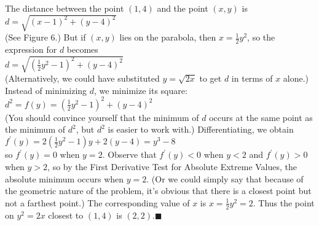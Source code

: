 \documentclass{sebase}
\begin{document}
\begin{Solution}
The distance between the point $(1,4)$ and the point $(x,y)$ is\\[6pt]
\hspace*{\fill}$d=\sqrt{(x-1)^{2}+(y-4)^{2}}$\hspace*{\fill}\\[6pt]
(See Figure 6.) But if $%
(x,y)$ lies on the parabola, then $x=\tfrac{1}{2}y^{2}$, so the expression
for $d$ becomes\\[6pt]
\hspace*{\fill}$d=\sqrt{\left( \tfrac{1}{2}y^{2}-1\right) ^{2}+(y-4)^{2}}$%
\hspace*{\fill}\\[6pt]
(Alternatively, we could have substituted $y=\sqrt{2x}$ to get $d$ in terms
of $x$ alone.) Instead of minimizing $d$, we minimize its square:\\[6pt]
\hspace*{\fill}$d^{2}=f(y)=\left( \tfrac{1}{2}y^{2}-1\right) ^{2}+(y-4)^{2}$%
\hspace*{\fill}\\[6pt]
(You should convince yourself that the minimum of $d$ occurs at the same
point as the minimum of $d^{2}$, but $d^{2}$ is easier to work with.)
Differentiating, we obtain\\[6pt]
\hspace*{\fill}$f^{\prime }(y)=2\!\left( \tfrac{1}{2}y^{2}-1\right)
\!y+2(y-4)=y^{3}-8$\hspace*{\fill}\\[6pt]
so $f^{\prime }(y)=0$ when $y=2$. Observe that $f^{\prime }(y)<0$ when $y<2$
and $f^{\prime }(y)>0$ when $y>2$, so by the First Derivative Test for
Absolute Extreme Values, the absolute minimum occurs when $y=2$. (Or we
could simply say that because of the geometric nature of the problem, it's
obvious that there is a closest point but not a farthest point.) The
corresponding value of $x$ is $x=\tfrac{1}{2}y^{2}=2$. Thus the point on $%
y^{2}=2x$ closest to $(1,4)$ is $(2,2)$.\vspace*{-18pt}$\blacksquare $
\end{Solution}
\end{document}
